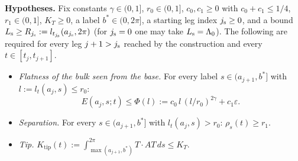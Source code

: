 \medskip\noindent\textbf{Hypotheses.} Fix constants $\gamma\in(0,1]$, $r_0\in(0,1]$, $c_0,c_1\ge0$ with $c_0+c_1\le1/4$,
$r_1\in(0,1]$, $K_T\ge0$, a label $b^*\in(0,2\pi]$, a starting leg index $j_{\mathrm s}\ge0$, and a bound
$L_{\mathrm s}\ge R_{j_{\mathrm s}}:=l_{t_{j_{\mathrm s}}}(a_{j_{\mathrm s}},2\pi)$ (for $j_{\mathrm s}=0$ one may take $L_{\mathrm s}=\Lambda_0$). The following are required for every
leg $j+1>j_{\mathrm s}$ reached by the construction and every $t\in[t_j,t_{j+1}]$.
\begin{itemize}
\item[\textup{(F$_b$)}] \emph{Flatness of the bulk seen from the base.} For every label $s\in(a_{j+1},b^*]$ with
$l:=l_t(a_j,s)\le r_0$:
\[
E(a_j,s;t)\le\Phi(l):=c_0\,l\,(l/r_0)^{2\gamma}+c_1\varepsilon .
\]
\item[\textup{(S)}] \emph{Separation.} For every $s\in(a_{j+1},b^*]$ with $l_t(a_j,s)>r_0$: $\rho_s(t)\ge r_1$.
\item[\textup{(T)}] \emph{Tip.} $K_{\mathrm{tip}}(t):=\displaystyle\int_{\max(a_{j+1},b^*)}^{2\pi}T\cdot AT\,ds\le K_T$.
\end{itemize}


